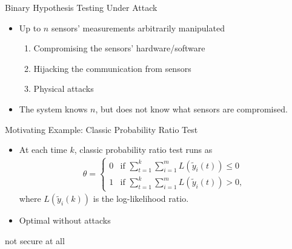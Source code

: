 \documentclass[10pt]{beamer}
\newlength\figureheight
\newlength\figurewidth
\newcommand{\tikzdir}[1]{#1.tikz}
\newcommand{\inputtikz}[1]{}}
\begin{document}
\begin{frame}{Binary Hypothesis Testing Under Attack}
  \begin{center}
    \setlength{\figureheight}{2cm}
    \setlength{\figurewidth}{10cm}
    \inputtikz{blockdiagram}
  \end{center}
\begin{itemize}
  \item Up to $n$ sensors' measurements arbitrarily manipulated
  \begin{enumerate}
  \item Compromising the sensors' hardware/software
  \item Hijacking the communication from sensors
  \item Physical attacks
  \end{enumerate}
  \vspace{2mm}
  \item The system knows $n$, but does not know what sensors are compromised.
\end{itemize}
\end{frame}


\begin{frame}{Motivating Example: Classic Probability Ratio Test}
    \begin{center}
    \setlength{\figureheight}{2cm}
    \setlength{\figurewidth}{10cm}
    \inputtikz{blockdiagram}
  \end{center}
\begin{itemize}
  \item At each time $k$, classic probability ratio test runs as
  \begin{align*}
        \theta = \begin{cases}
        0 & \text{if } \sum_{t=1}^{k}\sum_{i=1}^m L(\tilde y_i(t)) \leq 0\\
        1 & \text{if } \sum_{t=1}^{k}\sum_{i=1}^m L(\tilde y_i(t)) > 0,
        \end{cases}
  \end{align*}
  where $L(\tilde y_i(k))$ is the log-likelihood ratio.
  \item Optimal without attacks
\end{itemize}
\begin{center}
  {\Large{ {\color{red}not secure at all}}}
\end{center}
\end{frame}
\end{document}
